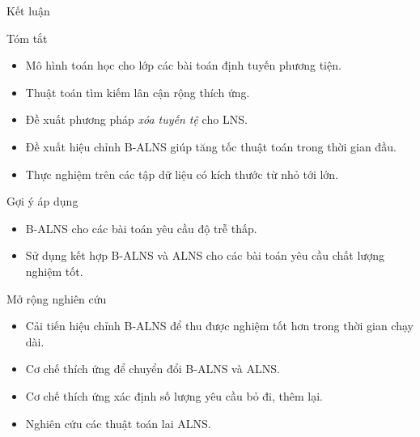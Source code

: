 \begin{frame}{Kết luận}
  \begin{block}{Tóm tắt}
    \begin{itemize}
      \item Mô hình toán học cho lớp các bài toán định tuyến phương tiện.
      \item Thuật toán tìm kiếm lân cận rộng thích ứng.
      \item Đề xuất phương pháp \textit{xóa tuyến tệ} cho LNS.
      \item Đề xuất hiệu chỉnh B-ALNS giúp tăng tốc thuật toán trong thời gian đầu.
      \item Thực nghiệm trên các tập dữ liệu có kích thước từ nhỏ tới lớn.
    \end{itemize}
  \end{block}
  \begin{block}{Gợi ý áp dụng}
    \begin{itemize}
      \item B-ALNS cho các bài toán yêu cầu độ trễ thấp.
      \item Sử dụng kết hợp B-ALNS và ALNS cho các bài toán yêu cầu chất lượng nghiệm tốt.
    \end{itemize}
  \end{block}
\end{frame}

\begin{frame}{Mở rộng nghiên cứu}
  \begin{itemize}
    \item Cải tiến hiệu chỉnh B-ALNS để thu được nghiệm tốt hơn trong thời gian chạy dài.
    \item Cơ chế thích ứng để chuyển đổi B-ALNS và ALNS.
    \item Cơ chế thích ứng xác định số lượng yêu cầu bỏ đi, thêm lại.
    \item Nghiên cứu các thuật toán lai ALNS.
  \end{itemize}
\end{frame}